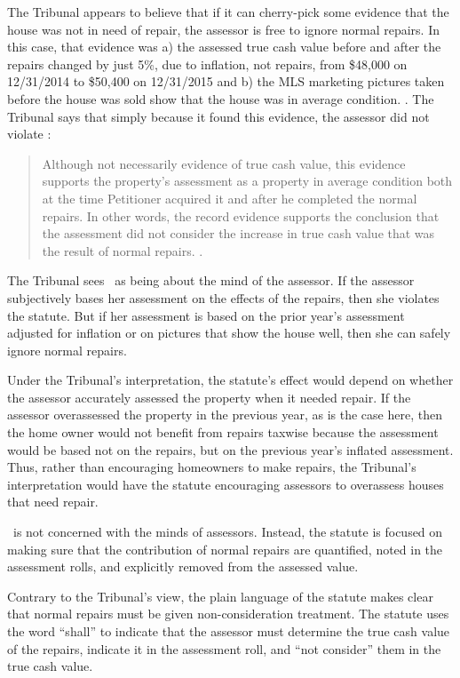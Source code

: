 \documentclass[12pt,\documentclassflag]{michiganCourtOfAppealsBrief}
\begin{document}
The Tribunal appears to believe that if it can cherry-pick some evidence that the house was not in need of repair, the assessor is free to ignore normal repairs.
In this case, that evidence was a) the assessed true cash value before and after the repairs changed by just 5\%, due to inflation, not repairs,
from \$48,000 on 12/31/2014 to \$50,400 on 12/31/2015 and
b) the MLS marketing pictures taken before the house was sold show that the house was in average condition. \reconsiderationDenied[2]. The Tribunal says that simply because it found this evidence, the assessor did not violate \mathieuGast:

\begin{quote}
	Although not necessarily evidence of true cash value, this evidence supports the property's assessment as a property in average condition both at the time Petitioner acquired it and after he completed the normal repairs. In other words, the record evidence supports the conclusion that the assessment did not consider the increase in true cash value that was the result of normal repairs. \reconsiderationDenied[2]. 
\end{quote}
 
The Tribunal sees \mathieuGast\ as being about the mind of the assessor. If the assessor subjectively bases her assessment on the effects of the repairs, then she violates the statute. But if her assessment is based on the prior year's assessment adjusted for inflation or on pictures that show the house well, then she can safely ignore normal repairs.

Under the Tribunal's interpretation, the statute's effect would depend on whether the assessor accurately assessed the property when it needed repair. If the assessor overassessed the property in the previous year, as is the case here, then the home owner would not benefit from repairs taxwise because the assessment would be based not on the repairs, but on the previous year's inflated assessment. Thus, rather than encouraging homeowners to make repairs, the Tribunal's interpretation would have the statute encouraging assessors to overassess houses that need repair.

\mathieuGast\ is not concerned with the minds of assessors.
Instead, the statute is focused on making sure that the contribution of normal repairs are quantified, noted in the assessment rolls, and explicitly removed from the assessed value.

Contrary to the Tribunal's view, the plain language of the statute makes clear that normal repairs must be given non-consideration treatment. The statute uses the word ``shall'' to indicate that the assessor must determine the true cash value of the repairs, indicate it in the assessment roll, and ``not consider'' them in the true cash value.
\end{document}
